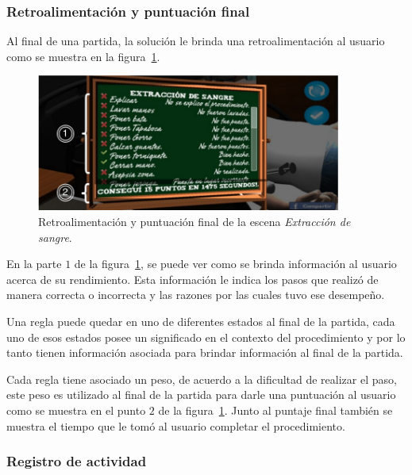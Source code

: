 \subsubsection{Retroalimentación y puntuación final}
\label{sec:puntuacion_hemocultivo}

Al final de una partida, la solución le brinda una retroalimentación al 
usuario como se muestra en la figura~\ref{fig:hemocultivo_retroalimentacion}.

\begin{figure}[H]
\centering 
\includegraphics[width=10cm]{solucion/images/hemocultivo_retroalimentacion.jpg}
\caption{Retroalimentación y puntuación final de la escena \emph{Extracción de
        sangre}.}
\label{fig:hemocultivo_retroalimentacion}
\end{figure}

En la parte $1$ de la figura~\ref{fig:hemocultivo_retroalimentacion}, se puede
ver como se brinda información al  usuario acerca de su rendimiento. Esta
información le indica los pasos que realizó de manera correcta o incorrecta y
las razones por las cuales tuvo ese desempeño.

Una regla puede quedar en uno de diferentes estados al final de la partida, cada
uno de esos estados posee un significado en el contexto del procedimiento y por
lo tanto tienen información asociada para brindar información al final de la
partida.

Cada regla tiene asociado un peso, de acuerdo a la dificultad de realizar el
paso, este peso es utilizado al final de la partida para darle una puntuación al
usuario como se muestra en el punto $2$ de la
figura~\ref{fig:hemocultivo_retroalimentacion}. Junto al puntaje final también
se muestra el tiempo que le tomó al usuario completar el procedimiento.


\subsubsection{Registro de actividad}

